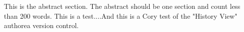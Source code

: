 This is the abstract section. The abstract should be one section and count less than 200 words. This is a test....And this is a Cory test of the "History View" authorea version control.